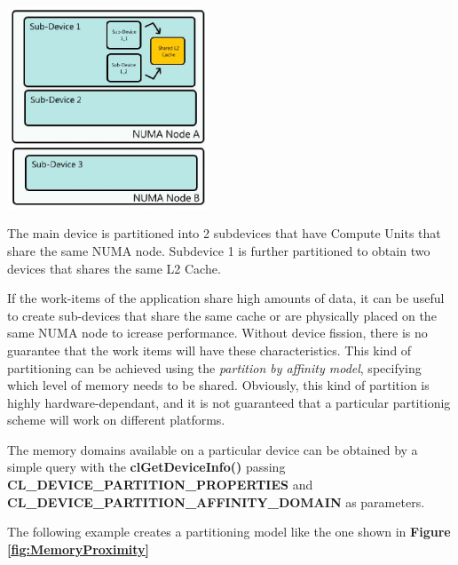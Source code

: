\begin{figurehere}
 \centering
 \includegraphics[width=6cm, height=6cm]{./eps/MemoryProximity.eps}
 \caption{The main device is partitioned into 2 subdevices that have Compute Units that share the same NUMA node. Subdevice 1 is further partitioned to obtain two devices that shares the same L2 Cache.}
 \label{fig:MemoryProximity}
\end{figurehere}

If the work-items of the application share high amounts of data, it can be useful to create sub-devices that share the same cache or are physically placed on the same NUMA node to icrease performance.
Without device fission, there is no guarantee that the work items will have these characteristics.
This kind of partitioning can be achieved using the \textit{partition by affinity model}, specifying which level of memory needs to be shared.
Obviously, this kind of partition is highly hardware-dependant, and it is not guaranteed that a particular partitionig scheme will work on different platforms.

\begin{CLCode}
The memory domains available on a particular device can be obtained by a simple query with the \textbf{clGetDeviceInfo()} passing \textbf{CL\_DEVICE\_PARTITION\_PROPERTIES} and \textbf{CL\_DEVICE\_PARTITION\_AFFINITY\_DOMAIN} as parameters.
\label{Code:MemoryDomains}
\end{CLCode}

The following example creates a partitioning model like the one shown in \textbf{Figure \ref{fig:MemoryProximity}}

